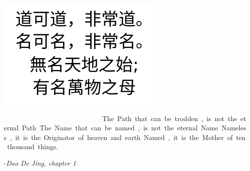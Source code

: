 


%
%
\begin{center}{\it

	\includegraphics[scale=0.5]{./Images/Chinese.jpeg}
	\vspace{0.8cm} 

	\renewcommand{\corpsgrootte}{15pt}
\lol\pe\Atlanpi\tom\comma \Atlanne\si \lol\tet

\na\pe\Atlanpi\na\comma \Atlanne\si \na\tet 

\si\Atlanne\Atlanpi\na\comma \si \mi \ta\som\an\tem 

\si\Atlanpi\na\comma \si \Atlanfi\pet \ta\on\mus 
\restorecorps

	\vspace{0.8cm} 

The Path that can be trodden, 

is not the eternal Path. 

The Name that can be named, 

is not the eternal Name. 

Nameless, it is the Originator  

of heaven and earth 

Named, it is the Mother  

of ten thousand things. 
}


\vspace{0.3cm}


-{\it Dao De Jing, chapter 1}

\end{center}


